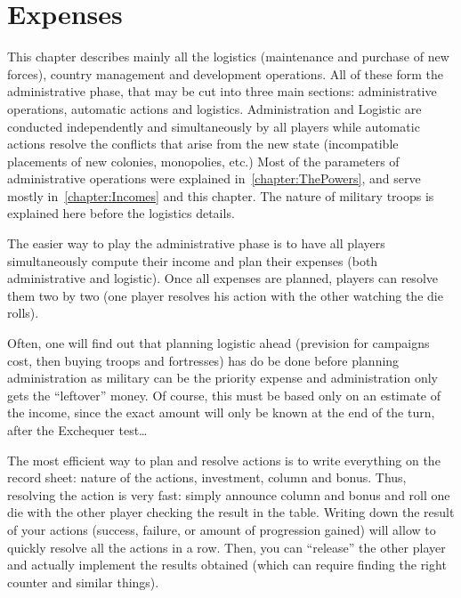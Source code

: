 
\chapter{Expenses}\label{chapter:Expenses}
\begin{designnote}[Expenses] This chapter describes mainly all the logistics
  (maintenance and purchase of new forces), country management and development
  operations. All of these form the administrative phase, that may be cut into
  three main sections: administrative operations, automatic actions and
  logistics. Administration and Logistic are conducted independently and
  simultaneously by all players while automatic actions resolve the conflicts
  that arise from the new state (incompatible placements of new colonies,
  monopolies, etc.) Most of the parameters of administrative operations were
  explained in~\ref{chapter:ThePowers}, and serve mostly
  in~\ref{chapter:Incomes} and this chapter. The nature of military troops is
  explained here before the logistics details.
\end{designnote}

\begin{playtip}
  The easier way to play the administrative phase is to have all players
  simultaneously compute their income and plan their expenses (both
  administrative and logistic). Once all expenses are planned, players can
  resolve them two by two (one player resolves his action with the other
  watching the die rolls).

  Often, one will find out that planning logistic ahead (prevision for
  campaigns cost, then buying troops and fortresses) has do be done before
  planning administration as military can be the priority expense and
  administration only gets the ``leftover'' money. Of course, this must be
  based only on an estimate of the income, since the exact amount will only be
  known at the end of the turn, after the Exchequer test\ldots

  The most efficient way to plan and resolve actions is to write everything on
  the record sheet: nature of the actions, investment, column and bonus. Thus,
  resolving the action is very fast: simply announce column and bonus and roll
  one die with the other player checking the result in the table. Writing down
  the result of your actions (success, failure, or amount of progression
  gained) will allow to quickly resolve all the actions in a row. Then, you
  can ``release'' the other player and actually implement the results obtained
  (which can require finding the right counter and similar things).
\end{playtip}

